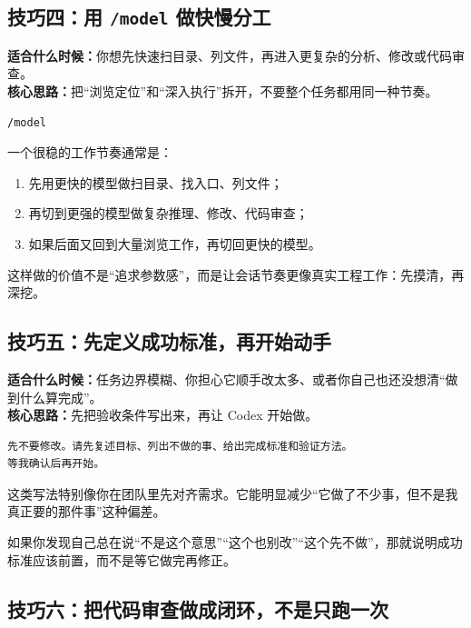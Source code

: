 \documentclass[UTF8,a4paper,12pt]{ctexart}
\begin{document}
\subsection{技巧四：用 \texttt{/model} 做快慢分工}

\textbf{适合什么时候：}你想先快速扫目录、列文件，再进入更复杂的分析、修改或代码审查。\\
\textbf{核心思路：}把“浏览定位”和“深入执行”拆开，不要整个任务都用同一种节奏。

\begin{lstlisting}[style=cli]
/model
\end{lstlisting}

一个很稳的工作节奏通常是：
\begin{enumerate}
  \item 先用更快的模型做扫目录、找入口、列文件；
  \item 再切到更强的模型做复杂推理、修改、代码审查；
  \item 如果后面又回到大量浏览工作，再切回更快的模型。
\end{enumerate}

这样做的价值不是“追求参数感”，而是让会话节奏更像真实工程工作：先摸清，再深挖。

\subsection{技巧五：先定义成功标准，再开始动手}

\textbf{适合什么时候：}任务边界模糊、你担心它顺手改太多、或者你自己也还没想清“做到什么算完成”。\\
\textbf{核心思路：}先把验收条件写出来，再让 Codex 开始做。

\begin{lstlisting}[style=prompt]
先不要修改。请先复述目标、列出不做的事、给出完成标准和验证方法。
等我确认后再开始。
\end{lstlisting}

这类写法特别像你在团队里先对齐需求。它能明显减少“它做了不少事，但不是我真正要的那件事”这种偏差。

\begin{tipbox}
如果你发现自己总在说“不是这个意思”“这个也别改”“这个先不做”，那就说明成功标准应该前置，而不是等它做完再修正。
\end{tipbox}

\subsection{技巧六：把代码审查做成闭环，不是只跑一次}
\end{document}
